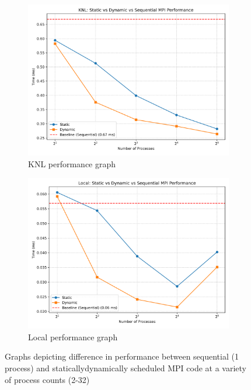 \documentclass[11pt]{article}
\begin{document}
\begin{figure}
\centering
\begin{subfigure}[t]{0.48\textwidth}
  \centering
    \includegraphics[width=\textwidth]{./images/knlq8.png}
  \caption{KNL performance graph}\label{fig:q8S}
\end{subfigure}%
\hfill
\begin{subfigure}[t]{0.48\textwidth}
  \centering
    \includegraphics[width=\textwidth]{./images/localq8.png}
  \caption{Local performance graph}\label{fig:q8D}
\end{subfigure}%
\caption{Graphs depicting difference in performance between sequential (1 process) and statically\/dynamically scheduled MPI code at a variety of process counts (2-32)}
\label{fig:q8}
\end{figure}
\end{document}
